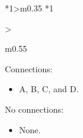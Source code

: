 \documentclass[../../main]{subfiles}
\begin{document}
\begin{center}
\begin{xltabular} {\textwidth} {
            *{1}{>{\centering\arraybackslash}m{0.35\linewidth}}
            *{1}{>{\raggedright\arraybackslash}m{0.55\linewidth}}
        }
        {\begin{minipage} [t] {0.4\linewidth}
            Connections:
            \begin{itemize}
                \setlength\itemsep{1pt}
                \item A, B, C, and D.
            \end{itemize}
        \end{minipage}
        \hfill
        \begin{minipage} [t] {0.4\linewidth}
            No connections:
            \begin{itemize}
                \setlength\itemsep{1pt}
                \item None.
            \end{itemize}
        \end{minipage}}

        \\
        \bottomrule

    \end{xltabular}
\end{center}
\end{document}
